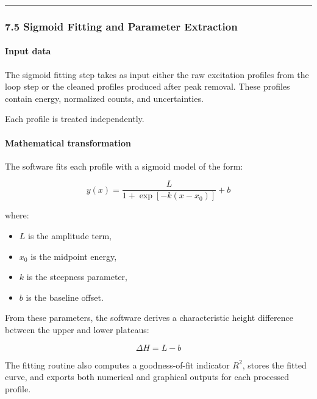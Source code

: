 \begin{center}\rule{0.5\linewidth}{0.5pt}\end{center}

\hypertarget{sigmoid-fitting-and-parameter-extraction}{%
\subsubsection{7.5 Sigmoid Fitting and Parameter
Extraction}\label{sigmoid-fitting-and-parameter-extraction}}

\hypertarget{input-data-4}{%
\paragraph{Input data}\label{input-data-4}}

The sigmoid fitting step takes as input either the raw excitation
profiles from the loop step or the cleaned profiles produced after peak
removal. These profiles contain energy, normalized counts, and
uncertainties.

Each profile is treated independently.

\hypertarget{mathematical-transformation-4}{%
\paragraph{Mathematical
transformation}\label{mathematical-transformation-4}}

The software fits each profile with a sigmoid model of the form:

\[
y(x) = \frac{L}{1+\exp\left[-k(x-x_0)\right]} + b
\]

where:

\begin{itemize}
\tightlist
\item
  \(L\) is the amplitude term,
\item
  \(x_0\) is the midpoint energy,
\item
  \(k\) is the steepness parameter,
\item
  \(b\) is the baseline offset.
\end{itemize}

From these parameters, the software derives a characteristic height
difference between the upper and lower plateaus:

\[
\Delta H = L - b
\]

The fitting routine also computes a goodness-of-fit indicator \(R^2\),
stores the fitted curve, and exports both numerical and graphical
outputs for each processed profile.

